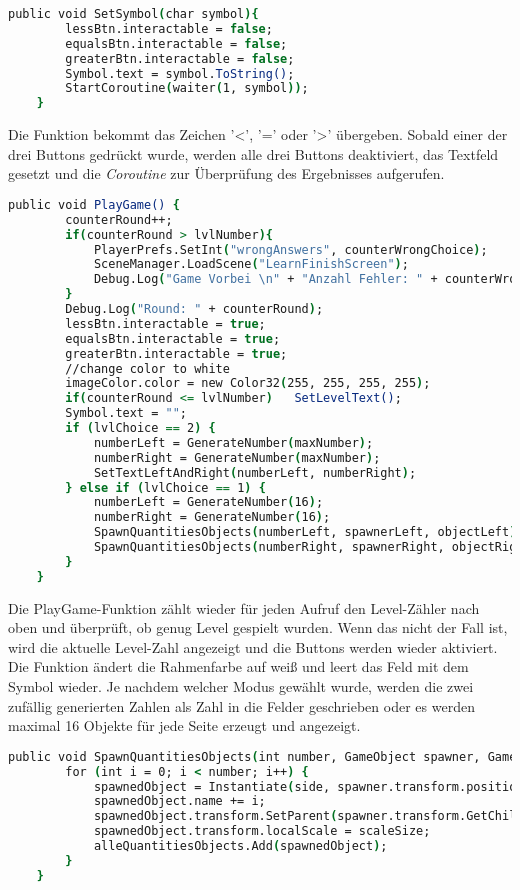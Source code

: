 \begin{lstlisting}[language=csh, caption={GameQuantities.cs SetSymbol-Funktion}]
	public void SetSymbol(char symbol){
		lessBtn.interactable = false;
		equalsBtn.interactable = false;
		greaterBtn.interactable = false;
		Symbol.text = symbol.ToString();
		StartCoroutine(waiter(1, symbol));
	}
\end{lstlisting}
Die Funktion bekommt das Zeichen '<', '=' oder '>' übergeben. Sobald einer der drei Buttons gedrückt wurde, werden alle drei Buttons deaktiviert, das Textfeld gesetzt und die \textit{Coroutine} zur Überprüfung des Ergebnisses aufgerufen.\\
\begin{lstlisting}[language=csh, caption={GameQuantities.cs PlayGame-Funktion}]
	public void PlayGame() {
		counterRound++;
		if(counterRound > lvlNumber){
			PlayerPrefs.SetInt("wrongAnswers", counterWrongChoice);
			SceneManager.LoadScene("LearnFinishScreen");
			Debug.Log("Game Vorbei \n" + "Anzahl Fehler: " + counterWrongChoice);
		}
		Debug.Log("Round: " + counterRound);
		lessBtn.interactable = true;
		equalsBtn.interactable = true;
		greaterBtn.interactable = true;
		//change color to white
		imageColor.color = new Color32(255, 255, 255, 255);
		if(counterRound <= lvlNumber)	SetLevelText();
		Symbol.text = "";
		if (lvlChoice == 2) {
			numberLeft = GenerateNumber(maxNumber);
			numberRight = GenerateNumber(maxNumber);
			SetTextLeftAndRight(numberLeft, numberRight);
		} else if (lvlChoice == 1) {
			numberLeft = GenerateNumber(16);
			numberRight = GenerateNumber(16);
			SpawnQuantitiesObjects(numberLeft, spawnerLeft, objectLeft);
			SpawnQuantitiesObjects(numberRight, spawnerRight, objectRight);
		}
	}
\end{lstlisting}
Die PlayGame-Funktion zählt wieder für jeden Aufruf den Level-Zähler nach oben und überprüft, ob genug Level gespielt wurden. Wenn das nicht der Fall ist, wird die aktuelle Level-Zahl angezeigt und die Buttons werden wieder aktiviert. Die Funktion ändert die Rahmenfarbe auf weiß und leert das Feld mit dem Symbol wieder. Je nachdem welcher Modus gewählt wurde, werden die zwei zufällig generierten Zahlen als Zahl in die Felder geschrieben oder es werden maximal 16 Objekte für jede Seite erzeugt und angezeigt.\\
\begin{lstlisting}[language=csh, caption={GameQuantities.cs SpawnQuantitiesObjects-Funktion}]
	public void SpawnQuantitiesObjects(int number, GameObject spawner, GameObject side) {
		for (int i = 0; i < number; i++) {
			spawnedObject = Instantiate(side, spawner.transform.position, Quaternion.identity);
			spawnedObject.name += i;
			spawnedObject.transform.SetParent(spawner.transform.GetChild(i / 4));
			spawnedObject.transform.localScale = scaleSize;
			alleQuantitiesObjects.Add(spawnedObject);
		}
	}
\end{lstlisting}
